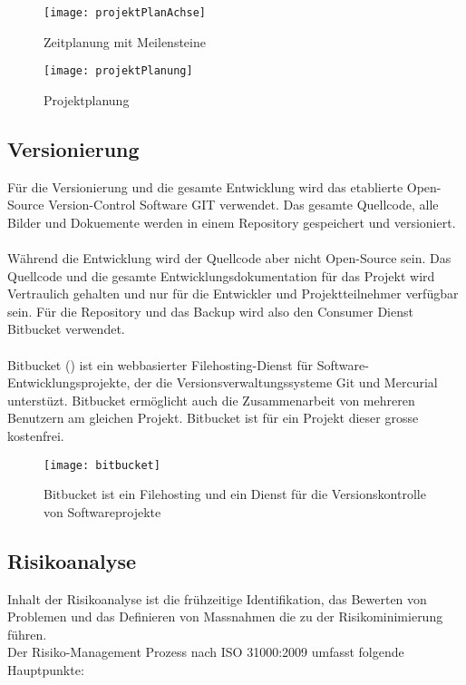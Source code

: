 \begin{figure}[htb!]
	\begin{center}
		\texttt{[image: projektPlanAchse]}
		\caption[Projektplanung Meilensteine]{Zeitplanung mit Meilensteine}
		\label{fig:projektPlanungAchse}
	\end{center}
\end{figure}


\begin{figure}[htb!]
	\begin{center}
		\texttt{[image: projektPlanung]}
		\caption[Projektplanung]{Projektplanung}
		\label{fig:projektPlanung}
	\end{center}
\end{figure}

\subsection{Versionierung}
Für die Versionierung und die gesamte Entwicklung wird das etablierte Open-Source Version-Control Software GIT verwendet. Das gesamte Quellcode, alle Bilder und Dokuemente werden in einem Repository gespeichert und versioniert.
\\
\\
Während die Entwicklung wird der Quellcode aber nicht Open-Source sein. Das Quellcode und die gesamte Entwicklungsdokumentation für das Projekt wird Vertraulich gehalten und nur für die Entwickler und Projektteilnehmer verfügbar sein. Für die Repository und das Backup wird also den Consumer Dienst Bitbucket verwendet.
\\
\\
Bitbucket () ist ein webbasierter Filehosting-Dienst für Software-Entwicklungsprojekte, der die Versionsverwaltungssysteme Git und Mercurial unterstüzt. Bitbucket ermöglicht auch die Zusammenarbeit von mehreren Benutzern am gleichen Projekt. Bitbucket ist für ein Projekt dieser grosse kostenfrei.
\begin{figure}[htb!]
	\begin{center}
		\texttt{[image: bitbucket]}
		\caption[Bitbucket ist ein Filehosting und ein Dienst für die Versionskontrolle von Softwareprojekte]{Bitbucket ist ein Filehosting und ein Dienst für die Versionskontrolle von Softwareprojekte}
		\label{fig:bitbucket}
	\end{center}
\end{figure}

\subsection{Risikoanalyse}
Inhalt der Risikoanalyse ist die frühzeitige Identifikation, das Bewerten von Problemen und das Definieren von Massnahmen die zu der Risikominimierung führen.
\\
Der Risiko-Management Prozess nach ISO 31000:2009 umfasst folgende Hauptpunkte: 

